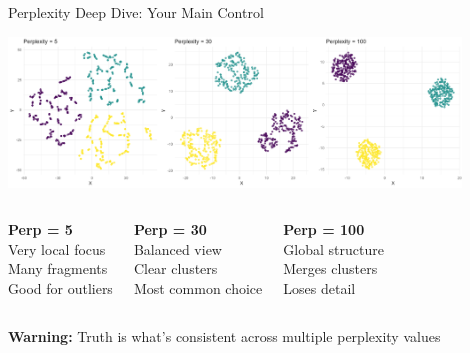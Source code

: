 \documentclass[aspectratio=169]{beamer}
\newcommand{\warning}[1]{\colorbox{red!10}{\textcolor{warningcolor}{\textbf{Warning:} #1}}}
\begin{document}
\begin{frame}{Perplexity Deep Dive: Your Main Control}
\begin{center}
\includegraphics[width=0.9\textwidth]{./Figures/perplexity_comparison.png}
\end{center}

\begin{columns}
\textbf{Perp = 5}\\
Very local focus\\
Many fragments\\
Good for outliers

\textbf{Perp = 30}\\
Balanced view\\
Clear clusters\\
Most common choice

\textbf{Perp = 100}\\
Global structure\\
Merges clusters\\
Loses detail
\end{columns}

\warning{Truth is what's consistent across multiple perplexity values}
\end{frame}
\end{document}
